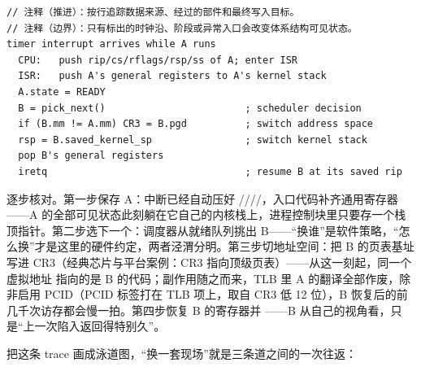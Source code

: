 \begin{lstlisting}
// 注释（推进）：按行追踪数据来源、经过的部件和最终写入目标。
// 注释（边界）：只有标出的时钟沿、阶段或异常入口会改变体系结构可见状态。
timer interrupt arrives while A runs
  CPU:   push rip/cs/rflags/rsp/ss of A; enter ISR
  ISR:   push A's general registers to A's kernel stack
  A.state = READY
  B = pick_next()                        ; scheduler decision
  if (B.mm != A.mm) CR3 = B.pgd          ; switch address space
  rsp = B.saved_kernel_sp                ; switch kernel stack
  pop B's general registers
  iretq                                  ; resume B at its saved rip
\end{lstlisting}

逐步核对。第一步保存 A：中断已经自动压好 ////，入口代码补齐通用寄存器——A 的全部可见状态此刻躺在它自己的内核栈上，进程控制块里只要存一个栈顶指针。第二步选下一个：调度器从就绪队列挑出 B——“换谁”是软件策略，“怎么换”才是这里的硬件约定，两者泾渭分明。第三步切地址空间：把 B 的页表基址写进 CR3（经典芯片与平台案例：CR3 指向顶级页表）——从这一刻起，同一个虚拟地址  指向的是 B 的代码；副作用随之而来，TLB 里 A 的翻译全部作废，除非启用 PCID（PCID 标签打在 TLB 项上，取自 CR3 低 12 位），B 恢复后的前几千次访存都会慢一拍。第四步恢复 B 的寄存器并 ——B 从自己的视角看，只是“上一次陷入返回得特别久”。

把这条 trace 画成泳道图，“换一套现场”就是三条道之间的一次往返：

